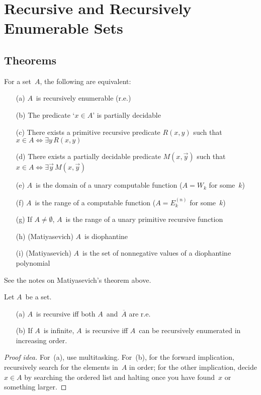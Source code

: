 %
%
%
\section{Recursive and Recursively Enumerable Sets}
\subsection*{Theorems}
\begin{thm}
For a set~\(A\), the following are equivalent:
\begin{enumerate}[itemsep=0pt]
\item[(a)] \(A\)~is recursively enumerable (r.e.)
\item[(b)] The predicate `\(x\in A\)' is partially decidable
\item[(c)] There exists a primitive recursive predicate \(R(x,y)\) such that \(x\in A\iff\exists y\,R(x,y)\)
\item[(d)] There exists a partially decidable predicate \(M(x,\vec{y})\) such that \(x\in A\iff\exists\vec{y}\,M(x,\vec{y})\)
\item[(e)] \(A\)~is the domain of a unary computable function (\(A=W_k\) for some~\(k\))
\item[(f)] \(A\)~is the range of a computable function (\(A=E_k^{(n)}\) for some~\(k\))
\item[(g)] If \(A\ne\emptyset\), \(A\)~is the range of a unary primitive recursive function
\item[(h)] (Matiyasevich) \(A\)~is diophantine
\item[(i)] (Matiyasevich) \(A\)~is the set of nonnegative values of a diophantine polynomial
\end{enumerate}
\end{thm}
\begin{app}
See the notes on Matiyasevich's theorem above.
\end{app}

\begin{thm}
Let \(A\)~be a set.
\begin{enumerate}[itemsep=0pt]
\item[(a)] \(A\)~is recursive iff both \(A\)~and~\(\overline{A}\) are r.e.
\item[(b)] If \(A\)~is infinite, \(A\)~is recursive iff \(A\)~can be recursively enumerated in increasing order.
\end{enumerate}
\end{thm}
\begin{proof}[Proof idea]
For~(a), use multitasking. For~(b), for the forward implication, recursively search for the elements in~\(A\) in order; for the other implication, decide \(x\in A\) by searching the ordered list and halting once you have found~\(x\) or something larger.
\end{proof}


